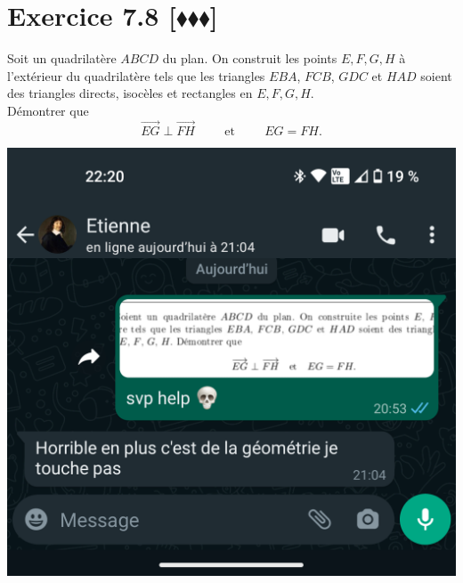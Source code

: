 \documentclass[10pt]{article}
\begin{document}

\section*{Exercice 7.8 [$\blacklozenge\blacklozenge\blacklozenge$]}
\begin{tcolorbox}[enhanced, width=7in, center, size=fbox, fontupper=\large, drop shadow southwest]
    Soit un quadrilatère $ABCD$ du plan. On construit les points $E, F, G, H$ à l'extérieur du quadrilatère tels que les triangles $EBA$, $FCB$, $GDC$ et $HAD$ soient des triangles directs, isocèles et rectangles en $E, F, G, H$.\\
    Démontrer que
    \begin{equation*}
        \overrightarrow{EG} \perp \overrightarrow{FH} \hspace{1cm} \text{et} \hspace{1cm} EG = FH.
    \end{equation*}
    \begin{center}
        \includegraphics*[scale=0.17]{./goat.png}
    \end{center}
\end{tcolorbox}

\end{document}
